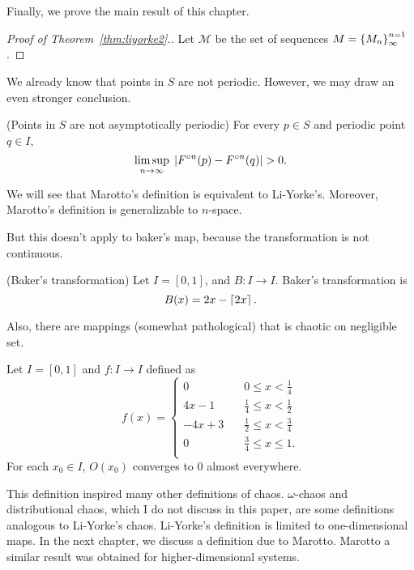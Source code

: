 \documentclass[12pt,draft,twoside]{book}
\begin{document}
Finally, we prove the main result of this chapter.
\begin{proof}[Proof of Theorem~\ref{thm:liyorke2}.]
  Let $\mathcal{M}$ be the set of sequences $M = \left \{ M_n \right \}^{n=1}_{\infty}$.
\end{proof}

We already know that points in $S$ are not periodic.
However, we may draw an even stronger conclusion.
\begin{theorem}
  (Points in $S$ are not asymptotically periodic)
  For every $p \in S$ and periodic point $q \in I$,
  \begin{equation*}
    \limsup\limits_{n \to \infty}\; \left | F^{\circ n}(p) - F^{\circ n}(q) \right | > 0.
  \end{equation*}
  \label{thm:liyorke3}
\end{theorem}

We will see that Marotto's definition is equivalent to Li-Yorke's.
Moreover, Marotto's definition is generalizable to $n$-space.

But this doesn't apply to baker's map, because the transformation is not continuous.
\begin{definition}
  (Baker's transformation)
  Let $I = [0,1]$, and $B: I \to I$. Baker's transformation is
  \begin{equation*}
    B(x) = 2x - \left \lceil 2x \right \rceil.
  \end{equation*}
\end{definition}

Also, there are mappings  (somewhat pathological) that is chaotic on negligible set.
\begin{proposition}
  Let $I = [0,1]$ and $f: I \to I$ defined as
  \begin{equation*}
    f(x) =
    \begin{cases}
      0 \quad & 0\leq x < \frac{1}{4} \\
      4x - 1 \quad  & \frac{1}{4} \leq x < \frac{1}{2} \\
      -4x + 3 \quad & \frac{1}{2} \leq x < \frac{3}{4} \\
      0 \quad & \frac{3}{4} \leq x \leq 1. \\
    \end{cases}
  \end{equation*}
  For each $x_0 \in I$, $O(x_0)$ converges to 0 almost everywhere.
\end{proposition}

This definition inspired many other definitions of chaos.
$\omega$-chaos and distributional chaos, which I do not discuss in this paper, are some definitions analogous to Li-Yorke's chaos.
Li-Yorke's definition is limited to one-dimensional maps.
In the next chapter, we discuss a definition due to Marotto.
Marotto a similar result was obtained for higher-dimensional systems.




\printindex
\end{document}
